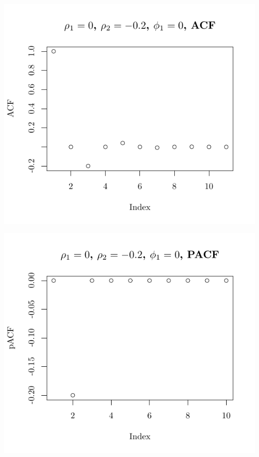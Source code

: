 \documentclass[10pt]{paper}\usepackage[]{graphicx}\usepackage[]{color}
\makeatletter
\def\maxwidth{ %
  \ifdim\Gin@nat@width>\linewidth
    \linewidth
  \else
    \Gin@nat@width
  \fi
}
\newenvironment{knitrout}{}{} %
\makeatother
\begin{document}
\begin{knitrout}
{\centering \includegraphics[width=\maxwidth]{figure/graphics-plotter-41} 

}




{\centering \includegraphics[width=\maxwidth]{figure/graphics-plotter-42} 

}





\end{knitrout}
\end{document}
